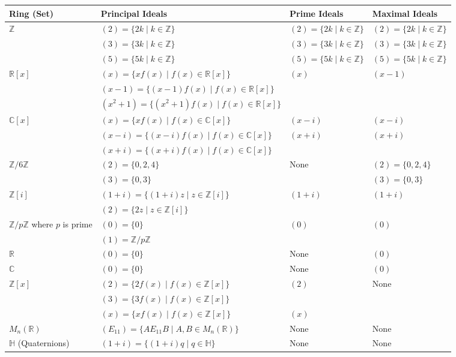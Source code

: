 \documentclass[11pt,openany]{article}
\begin{document}
\begin{center}
\begin{tabular}{|>{\centering\arraybackslash}m{4cm}|>{\centering\arraybackslash}m{4cm}|>{\centering\arraybackslash}m{4cm}|>{\centering\arraybackslash}m{4cm}|}
	\hline
	\textbf{Ring (Set)} & \textbf{Principal Ideals} & \textbf{Prime Ideals} & \textbf{Maximal Ideals} \\
	\hline
	\(\mathbb{Z}\) & \((2) = \{2k \mid k \in \mathbb{Z}\}\) & \((2) = \{2k \mid k \in \mathbb{Z}\}\) & \((2) = \{2k \mid k \in \mathbb{Z}\}\) \\
	& \((3) = \{3k \mid k \in \mathbb{Z}\}\) & \((3) = \{3k \mid k \in \mathbb{Z}\}\) & \((3) = \{3k \mid k \in \mathbb{Z}\}\) \\
	& \((5) = \{5k \mid k \in \mathbb{Z}\}\) & \((5) = \{5k \mid k \in \mathbb{Z}\}\) & \((5) = \{5k \mid k \in \mathbb{Z}\}\) \\
	\hline
	\(\mathbb{R}[x]\) & \((x) = \{x f(x) \mid f(x) \in \mathbb{R}[x]\}\) & \((x)\) & \((x-1)\) \\
	& \((x-1) = \{(x-1) f(x) \mid f(x) \in \mathbb{R}[x]\}\) &  &  \\
	& \((x^2+1) = \{(x^2+1) f(x) \mid f(x) \in \mathbb{R}[x]\}\) &  &  \\
	\hline
	\(\mathbb{C}[x]\) & \((x) = \{x f(x) \mid f(x) \in \mathbb{C}[x]\}\) & \((x-i)\) & \((x-i)\) \\
	& \((x-i) = \{(x-i) f(x) \mid f(x) \in \mathbb{C}[x]\}\) & \((x+i)\) & \((x+i)\) \\
	& \((x+i) = \{(x+i) f(x) \mid f(x) \in \mathbb{C}[x]\}\) &  &  \\
	\hline
	\(\mathbb{Z}/6\mathbb{Z}\) & \((2) = \{0, 2, 4\}\) & None & \((2) = \{0, 2, 4\}\) \\
	& \((3) = \{0, 3\}\) &  & \((3) = \{0, 3\}\) \\
	\hline
	\(\mathbb{Z}[i]\) & \((1+i) = \{(1+i) z \mid z \in \mathbb{Z}[i]\}\) & \((1+i)\) & \((1+i)\) \\
	& \((2) = \{2 z \mid z \in \mathbb{Z}[i]\}\) &  &  \\
	\hline
	\(\mathbb{Z}/p\mathbb{Z}\) where \(p\) is prime & \((0) = \{0\}\) & \((0)\) & \((0)\) \\
	& \((1) = \mathbb{Z}/p\mathbb{Z}\) &  &  \\
	\hline
	\(\mathbb{R}\) & \((0) = \{0\}\) & None & \((0)\) \\
	\hline
	\(\mathbb{C}\) & \((0) = \{0\}\) & None & \((0)\) \\
	\hline
	\(\mathbb{Z}[x]\) & \((2) = \{2 f(x) \mid f(x) \in \mathbb{Z}[x]\}\) & \((2)\) & None \\
	& \((3) = \{3 f(x) \mid f(x) \in \mathbb{Z}[x]\}\) &  &  \\
	& \((x) = \{x f(x) \mid f(x) \in \mathbb{Z}[x]\}\) & \((x)\) &  \\
	\hline
	\(M_n(\mathbb{R})\) & \((E_{11}) = \{A E_{11} B \mid A, B \in M_n(\mathbb{R})\}\) & None & None \\
	\hline
	\(\mathbb{H}\) (Quaternions) & \((1+i) = \{(1+i) q \mid q \in \mathbb{H}\}\) & None & None \\
	\hline
\end{tabular}
\end{center}
\end{document}
